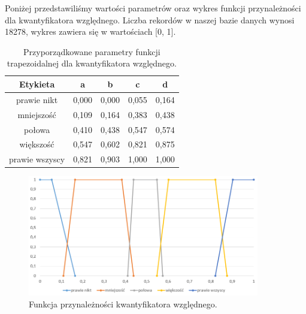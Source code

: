 \documentclass{classrep}
\begin{document}
	Poniżej przedstawiliśmy wartości parametrów oraz wykres funkcji przynależności dla kwantyfikatora względnego. Liczba rekordów w naszej bazie danych wynosi 18278, wykres zawiera się w wartościach [0, 1].
	\begin{table}[h!]
		\centering
		\begin{tabular} {c c c c c}
			\hline
			\textbf{Etykieta} & \textbf{a} & \textbf{b} & \textbf{c} & \textbf{d} \\ [0.5ex] 
			\hline	
			\hline 
			prawie nikt			 & 0,000 & 0,000 & 0,055 & 0,164 \\
			mniejszość			 & 0,109 & 0,164 & 0,383 & 0,438  \\
			połowa				 & 0,410 & 0,438 & 0,547 & 0,574  \\
			większość 		 	 & 0,547 & 0,602 & 0,821 & 0,875  \\	
			prawie wszyscy		 & 0,821 & 0,903 & 1,000 & 1,000  \\						
			\hline			
		\end{tabular}
		\caption{Przyporządkowane parametry funkcji trapezoidalnej dla kwantyfikatora względnego. }
		\label{tabelaKwantyfikatorWzgledny}
	\end{table}
	
	\begin{figure}[h!]
		\centering
		\includegraphics[width=0.9\textwidth]{kwantyfikatorWzgledny.png}
		\caption{Funkcja przynależności kwantyfikatora względnego.}
		\label{kwantyfikatorWzgledny}
	\end{figure}
\end{document}
